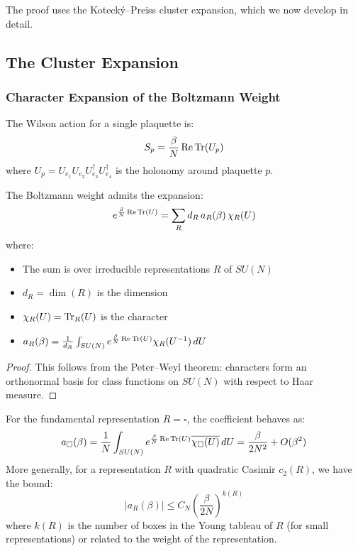 The proof uses the Koteck\'y--Preiss cluster expansion, which we now develop in detail.

\subsection{The Cluster Expansion}

\subsubsection{Character Expansion of the Boltzmann Weight}

The Wilson action for a single plaquette is:
\[
S_p = \frac{\beta}{N} \operatorname{Re} \operatorname{Tr}(U_p)
\]
where $U_p = U_{e_1} U_{e_2} U_{e_3}^\dagger U_{e_4}^\dagger$ is the 
holonomy around plaquette $p$.

\begin{lemma}
\label{lem:character-expansion}
The Boltzmann weight admits the expansion:
\[
e^{\frac{\beta}{N} \operatorname{Re} \operatorname{Tr}(U)} = \sum_{R} d_R \, a_R(\beta) \, \chi_R(U)
\]
where:
\begin{itemize}
    \item The sum is over irreducible representations $R$ of $SU(N)$
    \item $d_R = \dim(R)$ is the dimension
    \item $\chi_R(U) = \operatorname{Tr}_R(U)$ is the character
    \item $a_R(\beta) = \frac{1}{d_R} \int_{SU(N)} e^{\frac{\beta}{N} \operatorname{Re} \operatorname{Tr}(U)} \chi_R(U^{-1}) \, dU$
\end{itemize}
\end{lemma}

\begin{proof}
This follows from the Peter--Weyl theorem: characters form an orthonormal 
basis for class functions on $SU(N)$ with respect to Haar measure.
\end{proof}

\begin{lemma}
\label{lem:coefficient-bounds}
For the fundamental representation $R = \square$, the coefficient behaves as:
\[
a_\square(\beta) = \frac{1}{N} \int_{SU(N)} e^{\frac{\beta}{N} \operatorname{Re} \operatorname{Tr}(U)} \overline{\chi_\square(U)} \, dU = \frac{\beta}{2N^2} + O(\beta^2)
\]
More generally, for a representation $R$ with quadratic Casimir $c_2(R)$, we have the bound:
\[
|a_R(\beta)| \leq C_N \left(\frac{\beta}{2N}\right)^{k(R)}
\]
where $k(R)$ is the number of boxes in the Young tableau of $R$ (for small representations) or related to the weight of the representation.
\end{lemma}

